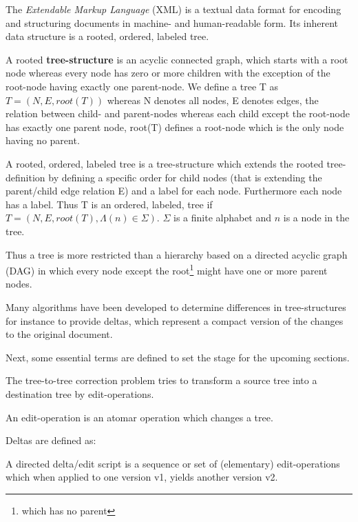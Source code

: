 The \emph{Extendable Markup Language} (XML) is a textual data format for encoding and structuring documents in machine- and human-readable form. Its inherent data structure is a rooted, ordered, labeled tree. 

\begin{mydef}
A rooted \textbf{tree-structure} is an acyclic connected graph, which starts with a root node whereas every node has zero or more children with the exception of the root-node having exactly one parent-node. We define a tree T as $T = (N, E, root(T))$ whereas N denotes all nodes, E denotes edges, the relation between child- and parent-nodes whereas each child except the root-node has exactly one parent node, root(T) defines a root-node which is the only node having no parent.
\end{mydef}

\begin{mydef}
A rooted, ordered, labeled tree is a tree-structure which extends the rooted tree-definition by defining a specific order for child nodes (that is extending the parent/child edge relation E) and a label for each node. Furthermore each node has a label. Thus T is an ordered, labeled, tree if $T = (N, E, root(T), \Lambda(n) \in \Sigma)$. $\Sigma$ is a finite alphabet and $n$ is a node in the tree.
\end{mydef}

Thus a tree is more restricted than a hierarchy based on a directed acyclic graph (DAG) in which every node except the root\footnote{which has no parent} might have one or more parent nodes.

Many algorithms have been developed to determine differences in tree-structures for instance to provide deltas, which represent a compact version of the changes to the original document.

Next, some essential terms are defined to set the stage for the upcoming sections.

The tree-to-tree correction problem tries to transform a source tree into a destination tree by edit-operations. 

\begin{mydef}
An edit-operation is an atomar operation which changes a tree.
\end{mydef}

Deltas are defined as:

\begin{mydef}
A directed delta/edit script is a sequence or set of (elementary) edit-operations which when applied to one version v1, yields another version v2.
\end{mydef}


